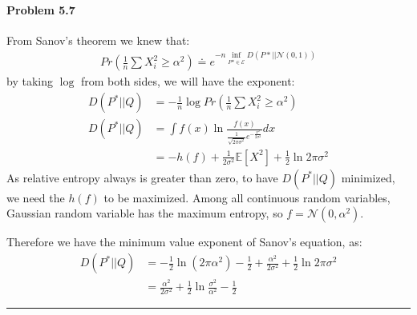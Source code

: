 \documentclass[12pt, letterpaper]{scrartcl}
\begin{document}
\paragraph*{Problem 5.7} \hfill\newline
From Sanov's theorem we knew that:
\begin{align*}
    Pr(\frac{1}{n}\sum X_i^2\geq\alpha^2)\doteq e^{-n \inf_{P*\in\mathcal{E}}D(P*||\mathcal{N}(0,1))}
\end{align*}
by taking $\log$ from both sides, we will have the exponent:
\begin{align*}
    D(P^*||Q)&=-\frac{1}{n}\log Pr(\frac{1}{n}\sum X_i^2\geq\alpha^2)\\
    D(P^*||Q)&=\int f(x)\ln\frac{f(x)}{\frac{1}{\sqrt{2\pi \sigma^2}}e^{-\frac{x^2}{2\sigma^2}}}dx\\
    &=-h(f) + \frac{1}{2\sigma^2}\mathbb{E}[X^2] + \frac{1}{2}\ln2\pi\sigma^2
\end{align*}
As relative entropy always is greater than zero, to have $D(P^*||Q)$ minimized, we need the $h(f)$ to be maximized. Among all continuous random variables, Gaussian random variable has the maximum entropy, so  $f=\mathcal{N}(0, \alpha^2)$.

Therefore we have the minimum value exponent of Sanov's equation, as:
\begin{align*}
    D(P^*||Q)&=-\frac{1}{2}\ln(2\pi\alpha^2)-\frac{1}{2}+\frac{\alpha^2}{2\sigma^2} + \frac{1}{2}\ln2\pi\sigma^2\\
    &=\frac{\alpha^2}{2\sigma^2} + \frac{1}{2}\ln\frac{\sigma^2}{\alpha^2}-\frac{1}{2}
\end{align*}

\hrule

\newpage
\end{document}
